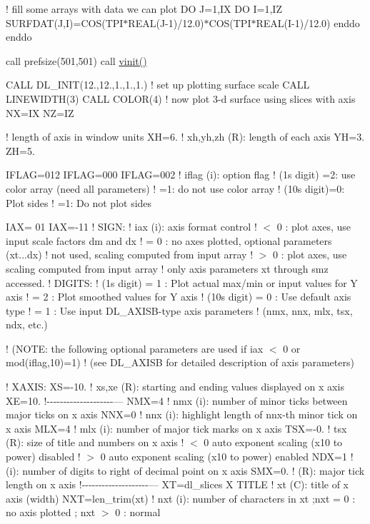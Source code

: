 ! fill some arrays with data we can plot DO J=1,IX DO I=1,IZ S\+U\+R\+F\+D\+A\+T(\+J,\+I)=C\+OS(T\+P\+I$\ast$\+R\+E\+AL(J-\/1)/12.0)$\ast$\+C\+OS(T\+P\+I$\ast$\+R\+E\+AL(I-\/1)/12.0) enddo enddo

call prefsize(501,501) call \hyperlink{namespacem__pixel_ac03ca8f23fdadb60599b6ea4dc87a6d9}{vinit()}

C\+A\+LL D\+L\+\_\+\+I\+N\+IT(12.,12.,1.,1.,1.) ! set up plotting surface scale C\+A\+LL L\+I\+N\+E\+W\+I\+D\+T\+H(3) C\+A\+LL C\+O\+L\+O\+R(4) ! now plot 3-\/d surface using slices with axis NX=IX NZ=IZ

! length of axis in window units XH=6. ! xh,yh,zh (R)\+: length of each axis YH=3. ZH=5.

I\+F\+L\+AG=012 I\+F\+L\+AG=000 I\+F\+L\+AG=002 ! iflag (i)\+: option flag ! (1\textquotesingle{}s digit) =2\+: use color array (need all parameters) ! =1\+: do not use color array ! (10\textquotesingle{}s digit)=0\+: Plot sides ! =1\+: Do not plot sides

I\+AX= 01 I\+AX=-\/11 ! S\+I\+GN\+: ! iax (i)\+: axis format control ! $<$ 0 \+: plot axes, use input scale factors dm and dx ! = 0 \+: no axes plotted, optional parameters (xt...dx) ! not used, scaling computed from input array ! $>$ 0 \+: plot axes, use scaling computed from input array ! only axis parameters xt through smz accessed. ! D\+I\+G\+I\+TS\+: ! (1\textquotesingle{}s digit) = 1 \+: Plot actual max/min or input values for Y axis ! = 2 \+: Plot smoothed values for Y axis ! (10\textquotesingle{}s digit) = 0 \+: Use default axis type ! = 1 \+: Use input D\+L\+\_\+\+A\+X\+I\+S\+B-\/type axis parameters ! (nmx, nnx, mlx, tsx, ndx, etc.)

! (N\+O\+TE\+: the following optional parameters are used if iax $<$ 0 or mod(iflag,10)=1) ! (see D\+L\+\_\+\+A\+X\+I\+SB for detailed description of axis parameters)

! X\+A\+X\+IS\+: XS=-\/10. ! xs,xe (R)\+: starting and ending values displayed on x axis XE=10. !-\/-\/-\/-\/-\/-\/-\/-\/-\/-\/-\/-\/-\/-\/-\/-\/-\/-\/-\/-\/--- N\+MX=4 ! nmx (i)\+: number of minor ticks between major ticks on x axis N\+NX=0 ! nnx (i)\+: highlight length of nnx-\/th minor tick on x axis M\+LX=4 ! mlx (i)\+: number of major tick marks on x axis T\+SX=-\/0. ! tsx (R)\+: size of title and numbers on x axis ! $<$ 0 auto exponent scaling (x10 to power) disabled ! $>$ 0 auto exponent scaling (x10 to power) enabled N\+DX=1 ! (i)\+: number of digits to right of decimal point on x axis S\+MX=0. ! (R)\+: major tick length on x axis !-\/-\/-\/-\/-\/-\/-\/-\/-\/-\/-\/-\/-\/-\/-\/-\/-\/-\/-\/-\/--- XT=\textquotesingle{}dl\+\_\+slices X T\+I\+T\+LE\textquotesingle{} ! xt (C)\+: title of x axis (width) N\+XT=len\+\_\+trim(xt) ! nxt (i)\+: number of characters in xt ;nxt = 0 \+: no axis plotted ; nxt $>$ 0 \+: normal

